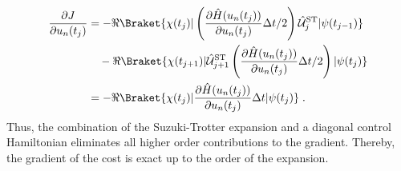 \begin{align}
	\frac{\partial J}{\partial u_n (t_j)} &= - \Re \Braket{\chi (t_j) |  \left(  \frac{\partial \hat{H} (u_n (t_j))}{\partial u_n (t_j)} \Delta t /2 \right) \hat{\mathcal{U}}_{j}^{\mathrm{ST}} | \psi (t_{j-1})} \nonumber \\
	& \quad - \Re \Braket{\chi (t_{j+1}) | \hat{\mathcal{U}}_{j+1}^{\mathrm{ST}} \left(  \frac{\partial \hat{H} (u_n (t_j))}{\partial u_n (t_j)} \Delta t /2 \right) | \psi (t_{j})} \nonumber \\
	&= - \Re \Braket{\chi (t_j) | \frac{\partial \hat{H} (u_n (t_j))}{\partial u_n (t_j)} \Delta t | \psi (t_{j})} \; . \label{eq:STcostgrad}
\end{align}  
Thus, the combination of the Suzuki-Trotter expansion and a diagonal control Hamiltonian eliminates all higher order contributions to the gradient. Thereby, the gradient of the cost is exact up to the order of the expansion.